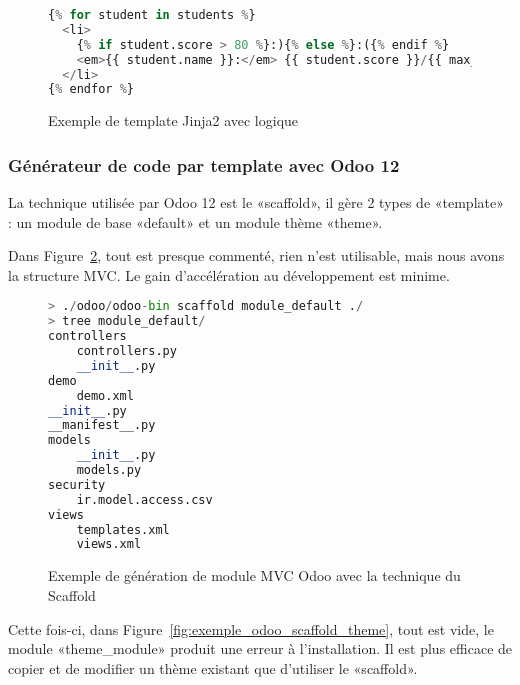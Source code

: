 
\begin{figure}
\begin{lstlisting}[language=Python]
{% for student in students %}
  <li>
	{% if student.score > 80 %}:){% else %}:({% endif %}
	<em>{{ student.name }}:</em> {{ student.score }}/{{ max_score }}
  </li>
{% endfor %}
\end{lstlisting}
\caption{Exemple de template Jinja2 avec logique}
\label{fig:gen_code_template_template_2}
\end{figure}


\subsubsection{Générateur de code par template avec Odoo 12}

La technique utilisée par Odoo 12 est le «scaffold», il gère 2 types de «template» : un module de base «default» et un module thème «theme».

Dans Figure~\ref{fig:exemple_odoo_scaffold_module}, tout est presque commenté, rien n’est utilisable, mais nous avons la structure MVC. Le gain d’accélération au développement est minime.

\begin{figure}
\begin{lstlisting}[language=Python]
> ./odoo/odoo-bin scaffold module_default ./
> tree module_default/
controllers
    controllers.py
    __init__.py
demo
    demo.xml
__init__.py
__manifest__.py
models
    __init__.py
    models.py
security
    ir.model.access.csv
views
    templates.xml
	views.xml
\end{lstlisting}
\caption{Exemple de génération de module MVC Odoo avec la technique du Scaffold}
\label{fig:exemple_odoo_scaffold_module}
\end{figure}

Cette fois-ci, dans Figure~\ref{fig:exemple_odoo_scaffold_theme}, tout est vide, le module «theme\_module» produit une erreur à l'installation. Il est plus efficace de copier et de modifier un thème existant que d'utiliser le «scaffold».

